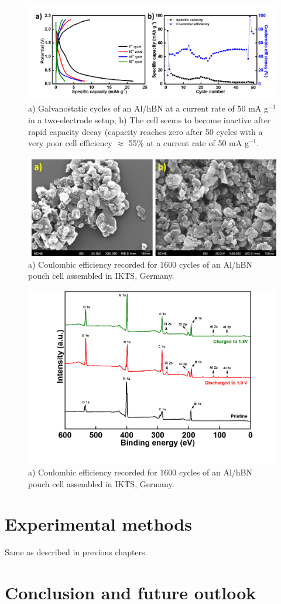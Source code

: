 \begin{figure}[tbh!]
\centering
\includegraphics[width=\textwidth]{Figures/BOhBN/BNNSCDCCE}
\caption{a) Galvanostatic cycles of an Al/hBN at a current rate of 50 mA g$^{-1}$ in a two-electrode setup, b) The cell seems to become inactive after rapid capacity decay (capacity reaches zero after 50 cycles with a very poor cell efficiency $\approx$ 55\% at a current rate of 50 mA g$^{-1}$.}
\label{Figures/BOhBN:hBNCDCCE}
\end{figure}
\begin{figure}[tbh!]
\centering
\includegraphics[width=\textwidth]{Figures/BOhBN/BNNSSEM}
\caption{a) Coulombic efficiency recorded for 1600 cycles of an Al/hBN pouch cell assembled in IKTS, Germany.}
\label{Figures/BOhBN:BNNSSEM}
\end{figure}
\begin{figure}[tbh!]
\centering
\includegraphics[width=\textwidth]{Figures/BOhBN/hBNXPS}
\caption{a) Coulombic efficiency recorded for 1600 cycles of an Al/hBN pouch cell assembled in IKTS, Germany.}
\label{Figures/BOhBN:hBNXPS}
\end{figure}
\section{Experimental methods}
Same as described in previous chapters.
\section{Conclusion and future outlook}
